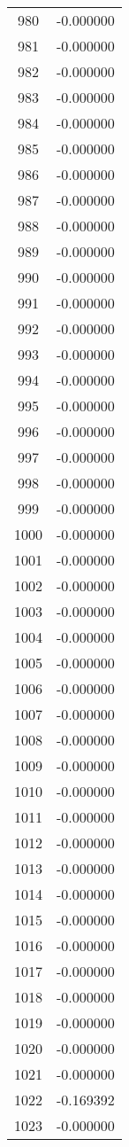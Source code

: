 \documentclass[12pt]{article}
\begin{document}
\begin{longtable}{@{}cc@{}}
980 & -0.000000 \\
981 & -0.000000 \\
982 & -0.000000 \\
983 & -0.000000 \\
984 & -0.000000 \\
985 & -0.000000 \\
986 & -0.000000 \\
987 & -0.000000 \\
988 & -0.000000 \\
989 & -0.000000 \\
990 & -0.000000 \\
991 & -0.000000 \\
992 & -0.000000 \\
993 & -0.000000 \\
994 & -0.000000 \\
995 & -0.000000 \\
996 & -0.000000 \\
997 & -0.000000 \\
998 & -0.000000 \\
999 & -0.000000 \\
1000 & -0.000000 \\
1001 & -0.000000 \\
1002 & -0.000000 \\
1003 & -0.000000 \\
1004 & -0.000000 \\
1005 & -0.000000 \\
1006 & -0.000000 \\
1007 & -0.000000 \\
1008 & -0.000000 \\
1009 & -0.000000 \\
1010 & -0.000000 \\
1011 & -0.000000 \\
1012 & -0.000000 \\
1013 & -0.000000 \\
1014 & -0.000000 \\
1015 & -0.000000 \\
1016 & -0.000000 \\
1017 & -0.000000 \\
1018 & -0.000000 \\
1019 & -0.000000 \\
1020 & -0.000000 \\
1021 & -0.000000 \\
1022 & -0.169392 \\
1023 & -0.000000 \\

\end{longtable}
\end{document}
